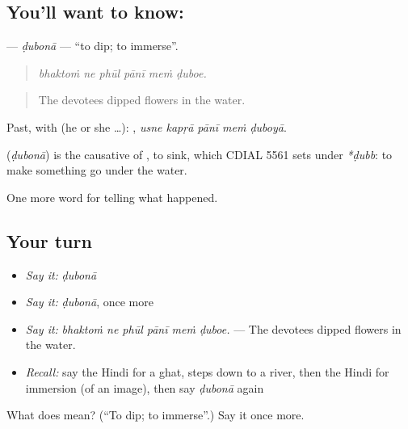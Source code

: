 \subsection*{You'll want to know: }
\textbf{} — \emph{ḍubonā} — \textquotedblleft{}to dip; to immerse\textquotedblright{}.

\begin{quote}
     
\end{quote}

\begin{quote}
\emph{bhaktoṁ ne phūl pānī meṁ ḍuboe.}
\end{quote}

\begin{quote}
The devotees dipped flowers in the water.
\end{quote}

Past, with  (he or she …):     , \emph{usne kapṛā pānī meṁ ḍuboyā}.

\begin{cousinweb}
\textbf{} (\emph{ḍubonā}) is the causative of \textbf{}, to sink, which CDIAL 5561 sets under \emph{*ḍubb}: to make something go under the water.
\end{cousinweb}

\begin{grammarlens}[title={What you've built}]
One more word for telling what happened.
\end{grammarlens}

\subsection*{Your turn}
\begin{itemize}
\raggedright
  \item \emph{Say it:} \emph{ḍubonā}
  \item \emph{Say it:} \emph{ḍubonā}, once more
  \item \emph{Say it:} \emph{bhaktoṁ ne phūl pānī meṁ ḍuboe.} — The devotees dipped flowers in the water.
  \item \emph{Recall:} say the Hindi for a ghat, steps down to a river, then the Hindi for immersion (of an image), then say \emph{ḍubonā} again
\end{itemize}

\begin{tcolorbox}[breakable,colback=teal!4,colframe=teal!35!black,title={Before you move on}]
What does  mean? (\textquotedblleft{}To dip; to immerse\textquotedblright{}.) Say it once more.
\end{tcolorbox}
